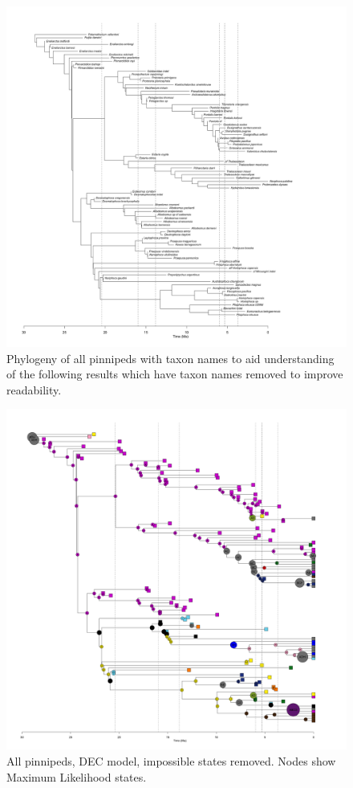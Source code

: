 \documentclass[a4paper, 12pt]{article}
\begin{document}
\begin{figure}[H]
 \centering
  \includegraphics[width = \linewidth]{figures/all-pinnipeds-tree.png}
  \caption{Phylogeny of all pinnipeds with taxon names to aid understanding of the following results which have taxon names removed to improve readability.}
  \label{fig-all-tree}
\end{figure} 

\begin{figure}[H]
 \centering
  \includegraphics[width = \linewidth]{figures/all-pinnipeds-DEC-impossible-MLstates.png}
  \caption{All pinnipeds, DEC model, impossible states removed. Nodes show Maximum Likelihood states.}
  \label{fig-all-dec-ml}
\end{figure} 
\end{document}
